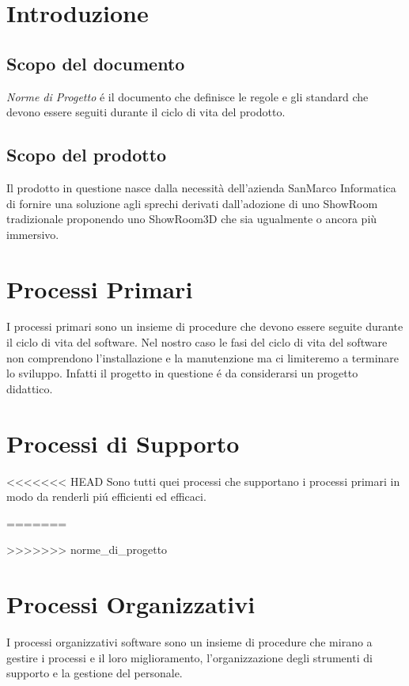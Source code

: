 \documentclass[a4paper]{article}
\begin{document}




\pagebreak

{
    \hypersetup{linkcolor=black}
    \tableofcontents
}
\pagebreak

\section{Introduzione}
\subsection{Scopo del documento}
\textit{Norme di Progetto} é il documento che definisce le regole e gli standard che devono essere seguiti durante il ciclo di vita del prodotto.
\subsection{Scopo del prodotto}
Il prodotto in questione nasce dalla necessità dell'azienda SanMarco Informatica di fornire una soluzione agli sprechi
derivati dall'adozione di uno ShowRoom tradizionale proponendo uno ShowRoom3D che sia ugualmente o ancora più immersivo.
\section{Processi Primari}
I processi primari sono un insieme di procedure che devono essere seguite  durante il ciclo di vita del software.
Nel nostro caso le fasi del ciclo di vita del software non comprendono l'installazione e la manutenzione ma ci limiteremo a terminare lo sviluppo.
Infatti il progetto in questione é da considerarsi un progetto didattico.

\pagebreak
\section{Processi di Supporto}
<<<<<<< HEAD
Sono tutti quei processi che supportano i processi primari in modo da renderli piú efficienti ed efficaci.

=======

\pagebreak

\pagebreak

\pagebreak

\pagebreak

>>>>>>> norme_di_progetto
\pagebreak
\section{Processi Organizzativi}
I processi organizzativi software sono un insieme di procedure che mirano a gestire i processi e il loro miglioramento, l'organizzazione degli strumenti 
di supporto e la gestione del personale.

\pagebreak

\pagebreak

\pagebreak
\end{document}
